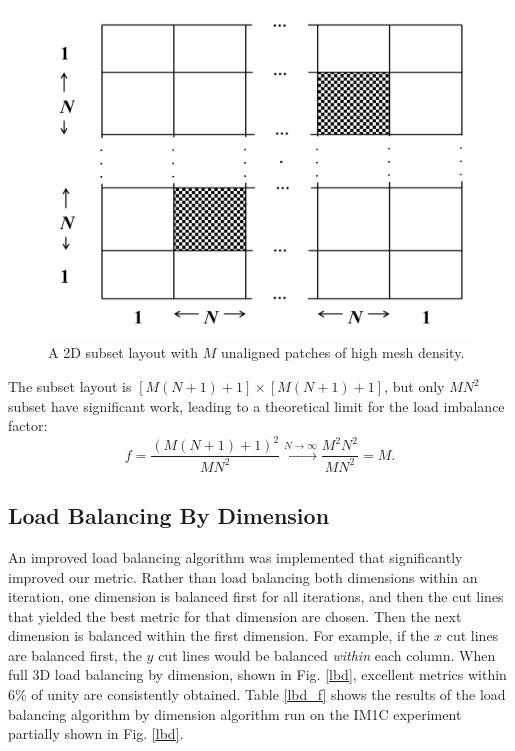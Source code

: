 \documentclass[letterpaper]{mandc2019}
\begin{document}
\begin{figure}[H]
\centering
\includegraphics[scale=0.6]{figures/2dgeneral.png}
\caption{A 2D subset layout with $M$ unaligned patches of high mesh density.}
\label{2dgeneral}
\end{figure}

The subset layout is $[M(N+1)+1] \times [M(N+1)+1]$, but only $MN^2$ subset have significant work, leading to a theoretical limit for the load imbalance factor:
\begin{equation}
f= \frac{\left( M(N+1)+1 \right)^2}{MN^2} \xrightarrow{N\to \infty} \frac{M^2N^2}{MN^2} = M.
\end{equation}

\subsection{Load Balancing By Dimension}
An improved load balancing algorithm was implemented that significantly improved our metric. Rather than load balancing both dimensions within an iteration, one dimension is balanced first for all iterations, and then the cut lines that yielded the best metric for that dimension are chosen. Then the next dimension is balanced within the first dimension. For example, if the $x$ cut lines are balanced first, the $y$ cut lines would be balanced \textit{within} each column. When full 3D load balancing by dimension, shown in Fig. \ref{lbd}, excellent metrics within 6\% of unity are consistently obtained. Table \ref{lbd_f} shows the results of the load balancing algorithm by dimension algorithm run on the IM1C experiment partially shown in Fig. \ref{lbd}. 
\end{document}
